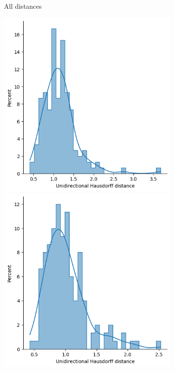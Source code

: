 \begin{figure}[htb]
\begin{subfigure}[t]{\textwidth+20pt\relax}
            \caption{All distances}\label{fig:udhsairplane1}
          \end{subfigure}\hfill
          \begin{subfigure}[t]{0.36\textwidth}
            \includegraphics[width=\textwidth]{figures/dropcon/matched_mean_udhs.png}
            \includegraphics[width=\textwidth]{figures/dropout/matched_mean_udhs.png}

\end{subfigure}
\end{figure}
